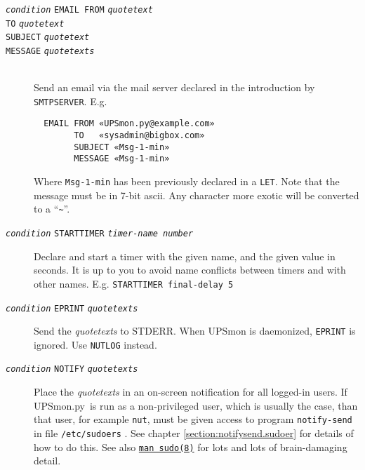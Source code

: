 \documentclass[12pt]{article}
\newcommand{\UPSmon}{\mbox{\textcolor{UPSMONCOLOUR}{UPSmon.py}}}
\newcommand{\ttit}[1]{\texttt{\textit{#1}}}
\newcommand{\LINman}[2]{\href{https://man7.org/linux/man-pages/man#2/#1.#2.html}{\texttt{man #1(#2)}}}
\begin{document}
\begin{description}
\begin{description}
\item[\ttit{condition} \texttt{EMAIL FROM} \ttit{quotetext}]
\vspace{-2mm}\item[\hspace{2cm} \texttt{TO} \ttit{quotetext}]
\vspace{-2mm}\item[\hspace{2cm} \texttt{SUBJECT} \ttit{quotetext}]
\vspace{-2mm}\item[\hspace{2cm} \texttt{MESSAGE} \ttit{quotetexts}]
\vspace{-2mm} \ \\
  Send an email  via the mail server declared in the
  introduction by \texttt{SMTPSERVER}.  E.g. 
  \begin{verbatim}
  EMAIL FROM «UPSmon.py@example.com»
        TO   «sysadmin@bigbox.com»
        SUBJECT «Msg-1-min»
        MESSAGE «Msg-1-min»\end{verbatim}
  Where \texttt{Msg-1-min} has been previously declared in a \texttt{LET}.
  Note that the message must be in 7-bit ascii.  Any character more exotic
  will be converted to a ``\texttt{\~}''.

\item[\ttit{condition} \texttt{STARTTIMER} \ttit{timer-name
    number}] \hspace{7mm} Declare and start a timer with the given name, and
  the given value in seconds.  It is up to you to avoid name conflicts between
  timers and with other names.  E.g. \texttt{STARTTIMER final-delay 5}

\item[\ttit{condition} \texttt{EPRINT} \ttit{quotetexts}] \hspace{7mm}
  Send the \textit{quotetexts} to STDERR.  When UPSmon is daemonized,
  \texttt{EPRINT} is ignored.  Use \texttt{NUTLOG} instead.

\item[\ttit{condition} \texttt{NOTIFY} \ttit{quotetexts}] \hspace{7mm}
  Place the \textit{quotetexts} in an on-screen notification for all logged-in
  users.  If \UPSmon\ is run as a non-privileged user, which is usually the
  case, than that user, for example \texttt{nut}, must be given access to
  program \texttt{notify-send} in file \texttt{/etc/sudoers} .  See chapter
  \ref{section:notifysend.sudoer} for details of how to do this.  See also
  \LINman{sudo}{8} for lots and lots of brain-damaging detail.


\end{description}
\end{description}
\end{document}
